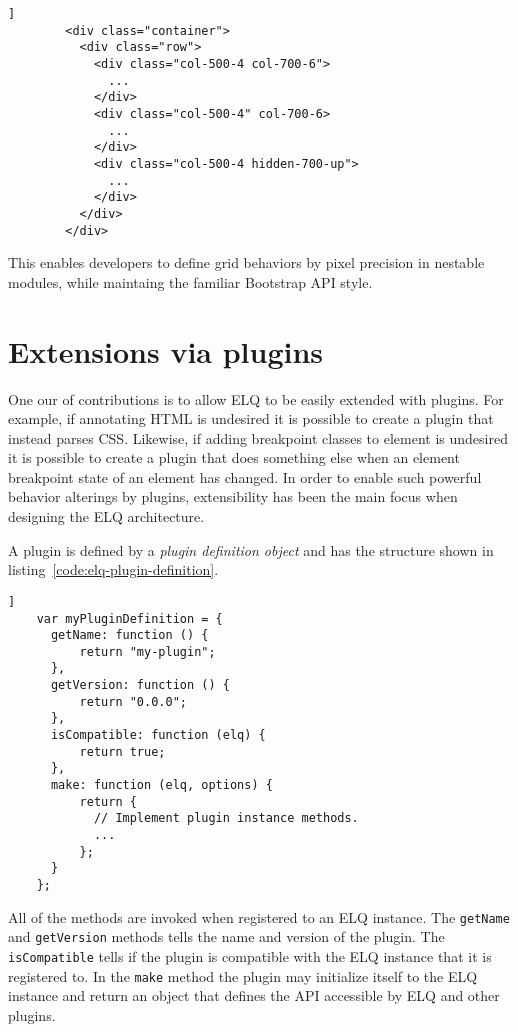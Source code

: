 \documentclass{acm_proc_article-sp}
\newcommand{\code}[1]{\texttt{#1}}
\newcommand{\elq}{ELQ}
\begin{document}
      \begin{lstlisting}[gobble=8,caption={},captionpos=b,label={code:elq-grid-example}]]
        <div class="container">
          <div class="row">
            <div class="col-500-4 col-700-6">
              ...
            </div>
            <div class="col-500-4" col-700-6>
              ...
            </div>
            <div class="col-500-4 hidden-700-up">
              ...
            </div>
          </div>
        </div>
      \end{lstlisting}

      This enables developers to define grid behaviors by pixel precision in nestable modules, while maintaing the familiar Bootstrap API style.


\section{Extensions via plugins}
  One our of contributions is to allow \elq{} to be easily extended with plugins.
  For example, if annotating HTML is undesired it is possible to create a plugin that instead parses CSS.
  Likewise, if adding breakpoint classes to element is undesired it is possible to create a plugin that does something else when an element breakpoint state of an element has changed.
  In order to enable such powerful behavior alterings by plugins, extensibility has been the main focus when designing the \elq{} architecture.

  A plugin is defined by a \emph{plugin definition object} and has the structure shown in listing~\ref{code:elq-plugin-definition}.
  \begin{lstlisting}[gobble=4,caption={},captionpos=b,label={code:elq-plugin-definition}]]
    var myPluginDefinition = {
      getName: function () {
          return "my-plugin";
      },
      getVersion: function () {
          return "0.0.0";
      },
      isCompatible: function (elq) {
          return true;
      },
      make: function (elq, options) {
          return {
            // Implement plugin instance methods.
            ...
          };
      }
    };
  \end{lstlisting}

  All of the methods are invoked when registered to an \elq{} instance.
  The \code{getName} and \code{getVersion} methods tells the name and version of the plugin.
  The \code{isCompatible} tells if the plugin is compatible with the \elq{} instance that it is registered to.
  In the \code{make} method the plugin may initialize itself to the \elq{} instance and return an object that defines the API accessible by \elq{} and other plugins.
\end{document}
